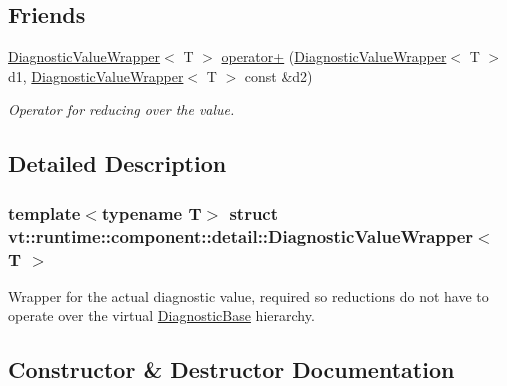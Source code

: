 \subsection*{Friends}
\begin{DoxyCompactItemize}
\item 
\hyperlink{structvt_1_1runtime_1_1component_1_1detail_1_1_diagnostic_value_wrapper}{Diagnostic\+Value\+Wrapper}$<$ T $>$ \hyperlink{structvt_1_1runtime_1_1component_1_1detail_1_1_diagnostic_value_wrapper_aaac15ad292fba50baddef633a19cf618}{operator+} (\hyperlink{structvt_1_1runtime_1_1component_1_1detail_1_1_diagnostic_value_wrapper}{Diagnostic\+Value\+Wrapper}$<$ T $>$ d1, \hyperlink{structvt_1_1runtime_1_1component_1_1detail_1_1_diagnostic_value_wrapper}{Diagnostic\+Value\+Wrapper}$<$ T $>$ const \&d2)
\begin{DoxyCompactList}\small\item\em Operator for reducing over the value. \end{DoxyCompactList}\end{DoxyCompactItemize}


\subsection{Detailed Description}
\subsubsection*{template$<$typename T$>$\newline
struct vt\+::runtime\+::component\+::detail\+::\+Diagnostic\+Value\+Wrapper$<$ T $>$}

Wrapper for the actual diagnostic value, required so reductions do not have to operate over the virtual {\ttfamily \hyperlink{structvt_1_1runtime_1_1component_1_1detail_1_1_diagnostic_base}{Diagnostic\+Base}} hierarchy. 

\subsection{Constructor \& Destructor Documentation}
\mbox{\label{structvt_1_1runtime_1_1component_1_1detail_1_1_diagnostic_value_wrapper_a23a27702c3d6bc7d676b68751b1650fd}} 
